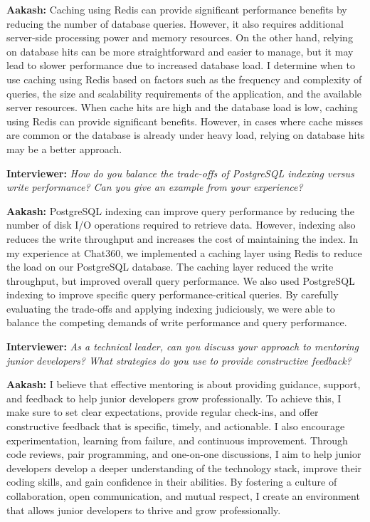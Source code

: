 \documentclass[12pt, a4paper]{article}
\newcommand{\interviewer}[1]{\noindent\textbf{Interviewer: }\textit{#1}\par\vspace{5pt}}
\newcommand{\candidate}[1]{\noindent\textbf{Aakash: }#1\par\vspace{15pt}}
\begin{document}
\candidate{Caching using Redis can provide significant performance benefits by reducing the number of database queries. However, it also requires additional server-side processing power and memory resources. On the other hand, relying on database hits can be more straightforward and easier to manage, but it may lead to slower performance due to increased database load. I determine when to use caching using Redis based on factors such as the frequency and complexity of queries, the size and scalability requirements of the application, and the available server resources. When cache hits are high and the database load is low, caching using Redis can provide significant benefits. However, in cases where cache misses are common or the database is already under heavy load, relying on database hits may be a better approach.}

\interviewer{How do you balance the trade-offs of PostgreSQL indexing versus write performance? Can you give an example from your experience?}

\candidate{PostgreSQL indexing can improve query performance by reducing the number of disk I/O operations required to retrieve data. However, indexing also reduces the write throughput and increases the cost of maintaining the index. In my experience at Chat360, we implemented a caching layer using Redis to reduce the load on our PostgreSQL database. The caching layer reduced the write throughput, but improved overall query performance. We also used PostgreSQL indexing to improve specific query performance-critical queries. By carefully evaluating the trade-offs and applying indexing judiciously, we were able to balance the competing demands of write performance and query performance.}

\interviewer{As a technical leader, can you discuss your approach to mentoring junior developers? What strategies do you use to provide constructive feedback?}

\candidate{I believe that effective mentoring is about providing guidance, support, and feedback to help junior developers grow professionally. To achieve this, I make sure to set clear expectations, provide regular check-ins, and offer constructive feedback that is specific, timely, and actionable. I also encourage experimentation, learning from failure, and continuous improvement. Through code reviews, pair programming, and one-on-one discussions, I aim to help junior developers develop a deeper understanding of the technology stack, improve their coding skills, and gain confidence in their abilities. By fostering a culture of collaboration, open communication, and mutual respect, I create an environment that allows junior developers to thrive and grow professionally.}
\end{document}
